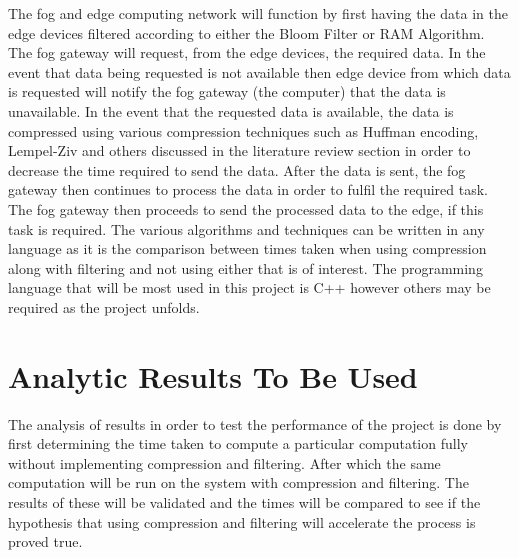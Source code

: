 \documentclass[11pt,journal, a4paper]{IEEEtran}
\begin{document}
\noindent
The fog and edge computing network will function by first having the data in the edge devices filtered according to either the Bloom Filter or RAM Algorithm. The fog gateway will request, from the edge devices, the required data. In the event that data being requested is not available then edge device from which data is requested will notify the fog gateway (the computer) that the data is unavailable. In the event that the requested data is available, the data is compressed using various compression techniques such as Huffman encoding, Lempel-Ziv and others discussed in the literature review section in order to decrease the time required to send the data. After the data is sent, the fog gateway then continues to process the data in order to fulfil the required task. The fog gateway then proceeds to send the processed data to the edge, if this task is required. The various algorithms and techniques can be written in any language as it is the comparison between times taken when using compression along with filtering and not using either that is of interest. The programming language that will be most used in this project is C++ however others may be required as the project unfolds. 




\section{Analytic Results To Be Used}
\noindent
The analysis of results in order to test the performance of the project is done by first determining the time taken to compute a particular computation fully without implementing compression and filtering. After which the same computation will be run on the system with compression and filtering. The results of these will be validated and the times will be compared to see if the hypothesis that using compression and filtering will accelerate the process is proved true.\\
\end{document}
